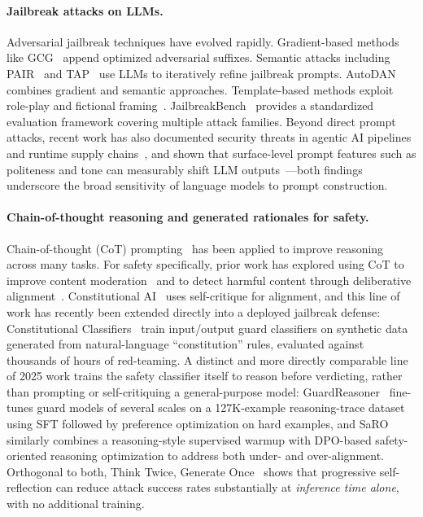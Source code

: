\documentclass[Superintelligence,article,submit,pdftex,moreauthors]{Definitions/mdpi}
\begin{document}
\paragraph{Jailbreak attacks on LLMs.}
Adversarial jailbreak techniques have evolved rapidly. Gradient-based methods like GCG~\citep{zou2023universal} append optimized adversarial suffixes. Semantic attacks including PAIR~\citep{chao2023jailbreaking} and TAP~\citep{mehrotra2024tree} use LLMs to iteratively refine jailbreak prompts. AutoDAN~\citep{liu2024autodan} combines gradient and semantic approaches. Template-based methods exploit role-play and fictional framing~\citep{wei2024jailbroken, shen2024anything}. JailbreakBench~\citep{chao2024jailbreakbench} provides a standardized evaluation framework covering multiple attack families. Beyond direct prompt attacks, recent work has also documented security threats in agentic AI pipelines and runtime supply chains~\citep{jiang2026agentic}, and shown that surface-level prompt features such as politeness and tone can measurably shift LLM outputs~\citep{cai2025tone}---both findings underscore the broad sensitivity of language models to prompt construction.

\paragraph{Chain-of-thought reasoning and generated rationales for safety.}
\label{sec:related-reasoning}
Chain-of-thought (CoT) prompting~\citep{wei2022chain} has been applied to improve reasoning across many tasks. For safety specifically, prior work has explored using CoT to improve content moderation~\citep{wang2024chain} and to detect harmful content through deliberative alignment~\citep{bai2024deliberative}. Constitutional AI~\citep{bai2022constitutional} uses self-critique for alignment, and this line of work has recently been extended directly into a deployed jailbreak defense: Constitutional Classifiers~\citep{sharma2025constitutional} train input/output guard classifiers on synthetic data generated from natural-language ``constitution'' rules, evaluated against thousands of hours of red-teaming. A distinct and more directly comparable line of 2025 work trains the safety classifier itself to reason before verdicting, rather than prompting or self-critiquing a general-purpose model: GuardReasoner~\citep{liu2025guardreasoner} fine-tunes guard models of several scales on a 127K-example reasoning-trace dataset using SFT followed by preference optimization on hard examples, and SaRO~\citep{mou2025saro} similarly combines a reasoning-style supervised warmup with DPO-based safety-oriented reasoning optimization to address both under- and over-alignment. Orthogonal to both, Think Twice, Generate Once~\citep{phan2025thinktwice} shows that progressive self-reflection can reduce attack success rates substantially at \emph{inference time alone}, with no additional training.
\end{document}
